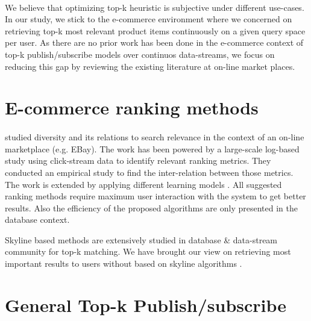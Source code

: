 \documentclass[a4paper,12pt,oneside]{book}
\theoremstyle{definition}
\theoremstyle{remark}
\begin{document}
\paragraph*{}
We believe that optimizing top-k heuristic is subjective under different use-cases. In our study, we stick to the e-commerce environment where we concerned on retrieving top-k most relevant product items continuously on a given query space per user. As there are no prior work has been done in the e-commerce context of top-k publish/subscribe models over continuos data-streams, we focus on reducing this gap by reviewing the existing literature at on-line market places. 
\section{E-commerce ranking methods}
\paragraph*{}
\cite{Parikh2011} studied diversity and its relations to search relevance in the context of an on-line marketplace (e.g. EBay). The work has been powered by a large-scale log-based study using click-stream data to identify relevant ranking metrics. They conducted an empirical study to find the inter-relation between those metrics. The work is extended by applying different learning models \cite{Sarma2014}. All suggested ranking methods require maximum user interaction with the system to get better results. Also the efficiency of the proposed algorithms are only presented in the database context.

Skyline based methods are extensively studied in database \& data-stream community for top-k matching. We have brought our view on retrieving most important results to users without based on skyline algorithms \cite{Sarma2014}.

\section{General Top-k Publish/subscribe}
\end{document}
